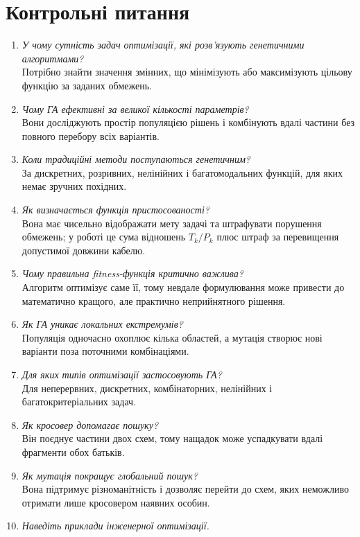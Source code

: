 \documentclass[12pt,a4paper]{article}
\begin{document}
\section{Контрольні питання}
\begin{enumerate}[leftmargin=*]
\item \textit{У чому сутність задач оптимізації, які розв'язують генетичними алгоритмами?}\\
Потрібно знайти значення змінних, що мінімізують або максимізують цільову функцію за заданих обмежень.
\item \textit{Чому ГА ефективні за великої кількості параметрів?}\\
Вони досліджують простір популяцією рішень і комбінують вдалі частини без повного перебору всіх варіантів.
\item \textit{Коли традиційні методи поступаються генетичним?}\\
За дискретних, розривних, нелінійних і багатомодальних функцій, для яких немає зручних похідних.
\item \textit{Як визначається функція пристосованості?}\\
Вона має чисельно відображати мету задачі та штрафувати порушення обмежень; у роботі це сума відношень $T_k/P_k$ плюс штраф за перевищення допустимої довжини кабелю.
\item \textit{Чому правильна fitness-функція критично важлива?}\\
Алгоритм оптимізує саме її, тому невдале формулювання може привести до математично кращого, але практично неприйнятного рішення.
\item \textit{Як ГА уникає локальних екстремумів?}\\
Популяція одночасно охоплює кілька областей, а мутація створює нові варіанти поза поточними комбінаціями.
\item \textit{Для яких типів оптимізації застосовують ГА?}\\
Для неперервних, дискретних, комбінаторних, нелінійних і багатокритеріальних задач.
\item \textit{Як кросовер допомагає пошуку?}\\
Він поєднує частини двох схем, тому нащадок може успадкувати вдалі фрагменти обох батьків.
\item \textit{Як мутація покращує глобальний пошук?}\\
Вона підтримує різноманітність і дозволяє перейти до схем, яких неможливо отримати лише кросовером наявних особин.
\item \textit{Наведіть приклади інженерної оптимізації.}\\

\end{enumerate}
\end{document}
